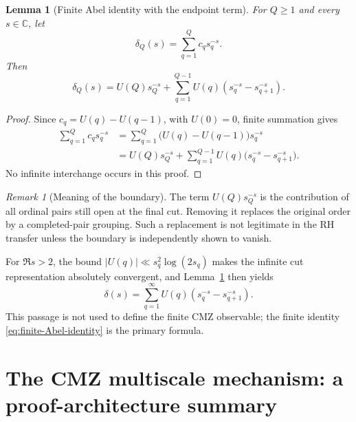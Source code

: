 \documentclass[11pt]{amsart}
\numberwithin{equation}{section}
\theoremstyle{plain}
\newtheorem{lemma}[theorem]{Lemma}
\theoremstyle{definition}
\theoremstyle{remark}
\newtheorem{remark}[theorem]{Remark}
\newcommand{\C}{\mathbb C}
\begin{document}
\begin{lemma}[Finite Abel identity with the endpoint term]
\label{lem:finite-Abel}
For $Q\ge1$ and every $s\in\C$, let
\begin{equation}
\delta_Q(s)=\sum_{q=1}^{Q}c_qs_q^{-s}.
\label{eq:deltaQ-definition}
\end{equation}
Then
\begin{equation}
\delta_Q(s)=U(Q)s_Q^{-s}
+\sum_{q=1}^{Q-1}U(q)
\left(s_q^{-s}-s_{q+1}^{-s}\right).
\label{eq:finite-Abel-identity}
\end{equation}
\end{lemma}

\begin{proof}
Since $c_q=U(q)-U(q-1)$, with $U(0)=0$, finite summation gives
\begin{align}
\sum_{q=1}^{Q}c_qs_q^{-s}
&=\sum_{q=1}^{Q}\bigl(U(q)-U(q-1)\bigr)s_q^{-s}
\label{eq:finite-Abel-first}\\
&=U(Q)s_Q^{-s}
+\sum_{q=1}^{Q-1}U(q)
\bigl(s_q^{-s}-s_{q+1}^{-s}\bigr).
\label{eq:finite-Abel-second}
\end{align}
No infinite interchange occurs in this proof.
\end{proof}

\begin{remark}[Meaning of the boundary]
\label{rem:unfinished-boundary}
The term $U(Q)s_Q^{-s}$ is the contribution of all ordinal pairs still open at
the final cut.  Removing it replaces the original order by a completed-pair
grouping.  Such a replacement is not legitimate in the RH transfer unless the
boundary is independently shown to vanish.
\end{remark}

For $\Re s>2$, the bound $|U(q)|\ll s_q^2\log(2s_q)$ makes the infinite
cut representation absolutely convergent, and Lemma~\ref{lem:finite-Abel}
then yields
\begin{equation}
\delta(s)=\sum_{q=1}^{\infty}U(q)
\left(s_q^{-s}-s_{q+1}^{-s}\right).
\label{eq:infinite-cut-representation}
\end{equation}
This passage is not used to define the finite CMZ observable; the finite
identity \eqref{eq:finite-Abel-identity} is the primary formula.

\section{The CMZ multiscale mechanism: a proof-architecture summary}
\label{sec:CMZ-summary}
\end{document}
